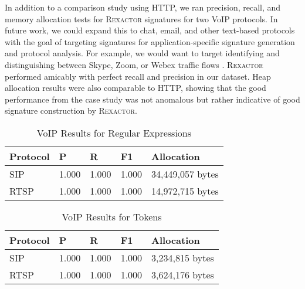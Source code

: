 In addition to a comparison study using HTTP, we ran precision, recall, and memory allocation tests for \textsc{Rexactor} signatures for two VoIP protocols. In future work, we could expand this to chat, email, and other text-based protocols with the goal of targeting signatures for application-specific signature generation and protocol analysis. For example, we would want to target identifying and distinguishing between Skype, Zoom, or Webex traffic flows \cite{Zhang}. \textsc{Rexactor} performed amicably with perfect recall and precision in our dataset. Heap allocation results were also comparable to HTTP, showing that the good performance from the case study was not anomalous but rather indicative of good signature construction by \textsc{Rexactor}.

\begin{table}[H]
  \centering
  \begin{tabular}{|l|l|l|l|l|}
   \hline
   Protocol & P & R & F1 & Allocation \\
   \hline\hline
   SIP & 1.000 & 1.000 & 1.000 & 34,449,057 bytes\\
   RTSP & 1.000 & 1.000 & 1.000 & 14,972,715 bytes \\
   \hline
  \end{tabular}
  \caption{VoIP Results for Regular Expressions}
  \label{table:voipregex}
\end{table}

\begin{table}[H]
  \centering
  \begin{tabular}{|l|l|l|l|l|}
   \hline
   Protocol & P & R & F1 & Allocation \\
   \hline\hline
   SIP & 1.000 & 1.000 & 1.000 & 3,234,815 bytes\\
   RTSP & 1.000 & 1.000 & 1.000 & 3,624,176 bytes \\
   \hline
  \end{tabular}
  \caption{VoIP Results for Tokens}
  \label{table:voiptokens}
\end{table}
